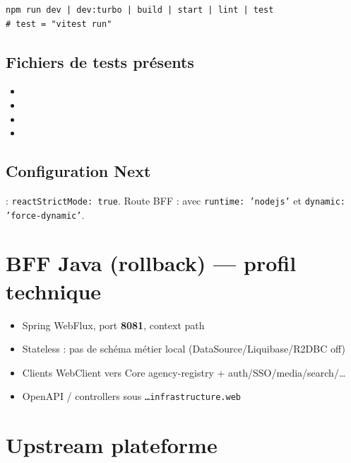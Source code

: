 \begin{lstlisting}
npm run dev | dev:turbo | build | start | lint | test
# test = "vitest run"
\end{lstlisting}

\subsection{Fichiers de tests présents}

\begin{itemize}
  \item {}
  \item {}
  \item {}
  \item {}
\end{itemize}


\subsection{Configuration Next}

 : \texttt{reactStrictMode: true}. Route BFF :
 avec \texttt{runtime: 'nodejs'} et
\texttt{dynamic: 'force-dynamic'}.

\section{BFF Java (rollback) --- profil technique}

\begin{itemize}
  \item Spring WebFlux, port \textbf{8081}, context path 
  \item Stateless : pas de schéma métier local (DataSource/Liquibase/R2DBC off)
  \item Clients WebClient vers Core agency-registry + auth/SSO/media/search/\ldots
  \item OpenAPI / controllers sous \texttt{…infrastructure.web}
\end{itemize}

\section{Upstream plateforme}

